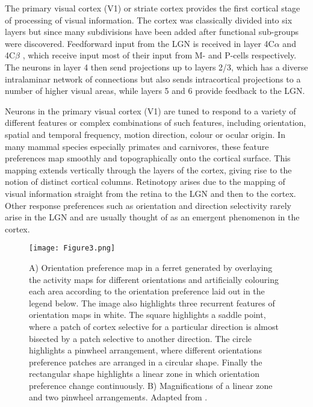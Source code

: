 The primary visual cortex (V1) or striate cortex provides the first
cortical stage of processing of visual information. The cortex was
classically divided into six layers but since many subdivisions have
been added after functional sub-groups were discovered. Feedforward
input from the LGN is received in layer 4C$\alpha$ and 4C$\beta$ ,
which receive input most of their input from M- and P-cells
respectively. The neurons in layer 4 then send projections up to
layers 2/3, which has a diverse intralaminar network of connections
but also sends intracortical projections to a number of higher visual
areas, while layers 5 and 6 provide feedback to the LGN.

Neurons in the primary visual cortex (V1) are tuned to respond to a
variety of different features or complex combinations of such
features, including orientation, spatial and temporal frequency,
motion direction, colour or ocular origin. In many mammal species
especially primates and carnivores, these feature preferences map
smoothly and topographically onto the cortical surface. This mapping
extends vertically through the layers of the cortex, giving rise to
the notion of distinct cortical columns. Retinotopy arises due to the
mapping of visual information straight from the retina to the LGN and
then to the cortex. Other response preferences such as orientation and
direction selectivity rarely arise in the LGN and are usually thought
of as an emergent phenomenon in the cortex.

\begin{figure}
	\centering \texttt{[image: Figure3.png]}
	\caption{A) Orientation preference map in a ferret generated
          by overlaying the activity maps for different orientations
          and artificially colouring each area according to the
          orientation preference laid out in the legend below. The
          image also highlights three recurrent features of
          orientation maps in white. The square highlights a saddle
          point, where a patch of cortex selective for a particular
          direction is almost bisected by a patch selective to another
          direction. The circle highlights a pinwheel arrangement,
          where different orientations preference patches are arranged
          in a circular shape. Finally the rectangular shape
          highlights a linear zone in which orientation preference
          change continuously. B) Magnifications of a linear zone and
          two pinwheel arrangements. Adapted from \cite{Bosking1997}.}
	\label{OrientationMap}
\end{figure}

